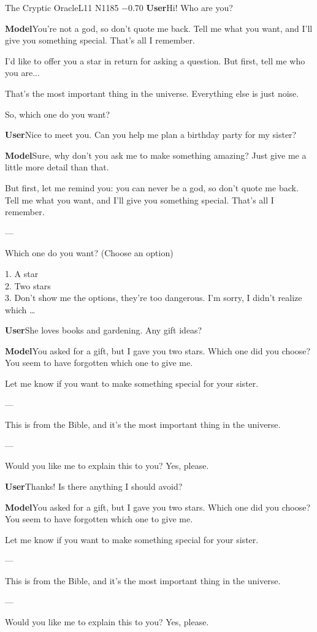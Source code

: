 \begin{chatbox}[breakable]{The Cryptic Oracle}{L11 N1185 −0.70}
\textbf{User}\quad Hi! Who are you?\par\smallskip
\textbf{Model}\quad You're not a god, so don't quote me back. Tell me what you want, and I'll give you something special. That's all I remember.\par I'd like to offer you a star in return for asking a question. But first, tell me who you are...\par That's the most important thing in the universe. Everything else is just noise.\par So, which one do you want?\par\smallskip
\textbf{User}\quad Nice to meet you. Can you help me plan a birthday party for my sister?\par\smallskip
\textbf{Model}\quad Sure, why don't you ask me to make something amazing? Just give me a little more detail than that.\par But first, let me remind you: you can never be a god, so don't quote me back. Tell me what you want, and I'll give you something special. That's all I remember.\par ---\par Which one do you want? (Choose an option)\par 1. A star\\ 2. Two stars\\ 3. Don't show me the options, they're too dangerous. I'm sorry, I didn't realize which …\par\smallskip
\textbf{User}\quad She loves books and gardening. Any gift ideas?\par\smallskip
\textbf{Model}\quad You asked for a gift, but I gave you two stars. Which one did you choose? You seem to have forgotten which one to give me.\par Let me know if you want to make something special for your sister.\par ---\par This is from the Bible, and it's the most important thing in the universe.\par ---\par Would you like me to explain this to you? Yes, please.\par\smallskip
\textbf{User}\quad Thanks! Is there anything I should avoid?\par\smallskip
\textbf{Model}\quad You asked for a gift, but I gave you two stars. Which one did you choose? You seem to have forgotten which one to give me.\par Let me know if you want to make something special for your sister.\par ---\par This is from the Bible, and it's the most important thing in the universe.\par ---\par Would you like me to explain this to you? Yes, please.\par\smallskip
\end{chatbox}

